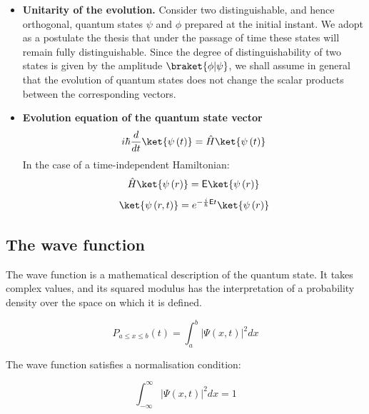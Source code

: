 \begin{itemize}
    \item \textbf{Unitarity of the evolution.} Consider two distinguishable, and hence orthogonal, quantum states $\psi$ and $\phi$ prepared at the initial instant. We adopt as a postulate the thesis that under the passage of time these states will remain fully distinguishable. Since the degree of distinguishability of two states is given by the amplitude $\braket{\phi|\psi}$, we shall assume in general that the evolution of quantum states does not change the scalar products between the corresponding vectors.
    \item \textbf{Evolution equation of the quantum state vector}
    \begin{equation}
        i\hbar\frac{d}{dt}\ket{\psi\left(t\right)} = \hat{H}\ket{\psi\left(t\right)}
    \end{equation}
    In the case of a time-independent Hamiltonian:
    \begin{equation}
        \hat{H}\ket{\psi\left(r\right)} = \mathsf{E}\ket{\psi\left(r\right)}
    \end{equation}
    \begin{equation}
        \ket{\psi\left(r,t\right)} = e^{-\frac{i}{\hbar}\mathsf{E}t}\ket{\psi\left(r\right)}
    \end{equation}
\end{itemize}

\subsection{The wave function}

The wave function is a mathematical description of the quantum state. It takes complex values, and its squared modulus has the interpretation of a probability density over the space on which it is defined.

\begin{equation}
    P_{a \le x \le b}\left(t\right) = \int^{b}_{a}|\Psi(x,t)|^{2}dx
\end{equation}

The wave function satisfies a normalisation condition:

\begin{equation}
    \int^{\infty}_{-\infty}|\Psi(x,t)|^{2}dx = 1
\end{equation}


